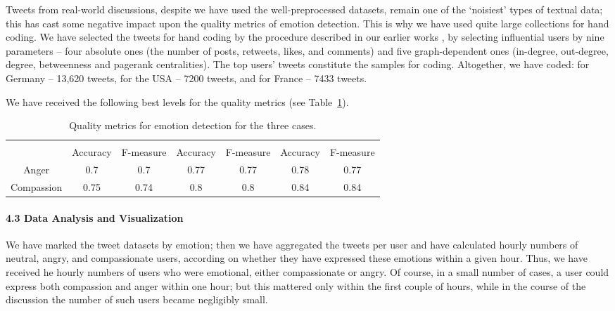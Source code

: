Tweets from real-world discussions, despite we have used the well-preprocessed datasets, remain one of the ‘noisiest’ types of textual data; this has cast some negative impact upon the quality metrics of emotion detection. This is why we have used quite large collections for hand coding. We have selected the tweets for hand coding by the procedure described in our earlier works \cite{BodrunovaLitvinenkoBlekanov2017,BodrunovaBlekanovSmoliarova}, by selecting influential users by nine parameters -- four absolute ones (the number of posts, retweets, likes, and comments) and five graph-dependent ones (in-degree, out-degree, degree, betweenness and pagerank centralities). The top users’ tweets constitute the samples for coding. Altogether, we have coded: for Germany -- 13,620 tweets, for the USA -- 7200 tweets, and for France -- 7433 tweets.

We have received the following best levels for the quality metrics (see Table~\cref{tab:threeCasesQualityMetrics}).

\begin{table}[ht]%
	\centering
	\caption{Quality metrics for emotion detection for the three cases.}%
	\label{tab:threeCasesQualityMetrics}%
	\begin{adjustbox}{width=1\textwidth}
		\small
		\begin{tabular}{ c  c  c  c  c  c  c  }%
			\toprule
			& \multicolumn{2}{c}{\makecell{Germany}} & \multicolumn{2}{c}{\makecell{The USA}} & \multicolumn{2}{c}{\makecell{France}} \\
			& Accuracy & F-measure & Accuracy & F-measure & Accuracy & F-measure \\
			\hline
			Anger & 0.7 & 0.7 & 0.77 & 0.77 & 0.78 & 0.77 \\
			Compassion & 0.75 & 0.74 & 0.8 & 0.8 & 0.84 & 0.84 \\
			\bottomrule
		\end{tabular}%
	\end{adjustbox}
\end{table}

\paragraph{4.3 Data Analysis and Visualization}

We have marked the tweet datasets by emotion; then we have aggregated the tweets per user and have calculated hourly numbers of neutral, angry, and compassionate users, according on whether they have expressed these emotions within a given hour. Thus, we have received he hourly numbers of users who were emotional, either compassionate or angry. Of course, in a small number of cases, a user could express both compassion and anger within one hour; but this mattered only within the first couple of hours, while in the course of the discussion the number of such users became negligibly small.

